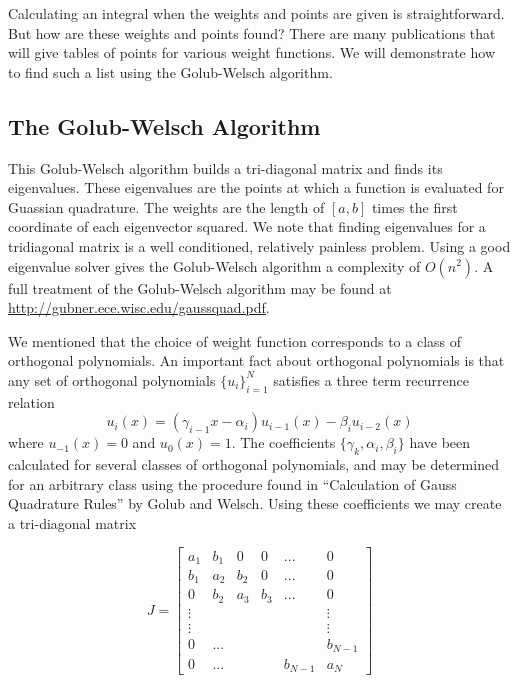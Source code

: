 Calculating an integral when the weights and points are given is straightforward.
But how are these weights and points found?
There are many publications that will give tables of points for various weight functions.
We will demonstrate how to find such a list using the Golub-Welsch algorithm.

\subsection*{The Golub-Welsch Algorithm} %

This Golub-Welsch algorithm builds a tri-diagonal matrix and finds its eigenvalues.
These eigenvalues are the points at which a function is evaluated for Guassian quadrature.
The weights are the length of $\left[a, b\right]$ times the first coordinate of each eigenvector squared.
We note that finding eigenvalues for a tridiagonal matrix is a well conditioned, relatively painless problem.
Using a good eigenvalue solver gives the Golub-Welsch algorithm a complexity of $O(n^2)$.
A full treatment of the Golub-Welsch algorithm may be found at \url{http://gubner.ece.wisc.edu/gaussquad.pdf}.

We mentioned that the choice of weight function corresponds to a class of orthogonal polynomials.
An important fact about orthogonal polynomials is that any set of orthogonal polynomials $\{u_i\}_{i=1}^{N}$ satisfies a three term recurrence relation
\[
u_{i}(x) = (\gamma_{i-1}x-\alpha_i)u_{i-1}(x) - \beta_iu_{i-2}(x)
\]
where $u_{-1}(x) = 0$ and $u_0(x) = 1$.
The coefficients $\{\gamma_k, \alpha_i, \beta_i\}$ have been calculated for several classes of orthogonal polynomials, and may be determined for an arbitrary class using the procedure found in ``Calculation of Gauss Quadrature Rules'' by Golub and Welsch.
Using these coefficients we may create a tri-diagonal matrix

\[
J = \begin{bmatrix}

a_1 & b_1 & 0 & 0 & ... & 0 \\
b_1 & a_2 & b_2 & 0 & ... & 0 \\
0 & b_2 & a_3 & b_3 & ... & 0 \\
\vdots & & & & & \vdots \\
\vdots & & & & & \vdots \\
0 & ... & & & & b_{N-1} \\
0 & ... & & & b_{N-1} & a_N

\end{bmatrix}
\]

